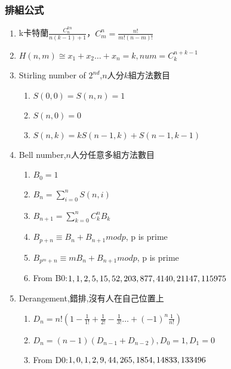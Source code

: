 \subsubsection{排組公式}
\begin{enumerate}\itemsep = -4pt
\item k卡特蘭$\frac{C_{n}^{kn}}{n(k-1)+1}$，$C_{m}^{n}=\frac{n!}{m!(n-m)!}$
\item $H(n,m)\cong x_1+x_2\ldots +x_n=k, num=C_{k}^{n+k-1}$
\item Stirling number of $2^{nd}$,$n$人分$k$組方法數目
	\begin{enumerate}\itemsep = -2pt
		\item $S(0,0)=S(n,n)=1$
		\item $S(n,0)=0$
		\item $S(n,k)=kS(n-1,k)+S(n-1,k-1)$
	\end{enumerate}
\item Bell number,$n$人分任意多組方法數目
	\begin{enumerate}\itemsep = -2pt
		\item $B_0=1$
		\item $B_n=\sum_{i=0}^nS(n,i)$
		\item $B_{n+1}=\sum_{k=0}^{n} C_k^n B_k$
		\item $B_{p+n}\equiv B{_n}+B_{n+1} mod p$, p is prime
		\item $B_{p^m+n}\equiv mB{_n}+B_{n+1} mod p$, p is prime
		\item From B0:$1,1,2,5,15,52,\\203,877,4140,21147,115975$
	\end{enumerate}
\item Derangement,錯排,沒有人在自己位置上
	\begin{enumerate}\itemsep = -2pt
		\item $D_n=n!(1-\frac{1}{1!}+\frac{1}{2!}-\frac{1}{3!}\ldots +(-1)^n\frac{1}{n!})$
		\item $D_n=(n-1)(D_{n-1}+D_{n-2}),D_0=1,D_1=0$
		\item From D0:$1,0,1,2,9,44,\\265,1854,14833,133496$
	\end{enumerate}
\end{enumerate}

